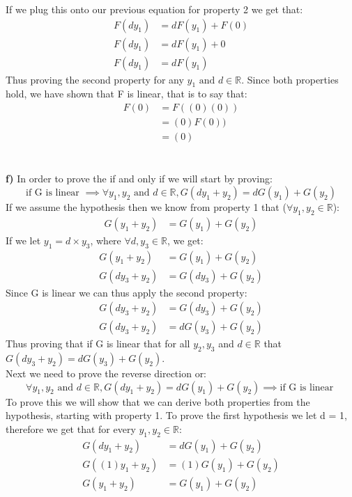 \documentclass[11pt]{article}
\begin{document}
If we plug this onto our previous equation for property 2 we get that:
\begin{align*}
F(dy_1) &= dF(y_1) + F(0)\\
F(dy_1) &= dF(y_1) + 0\\
F(dy_1) &= dF(y_1)
\end{align*}
Thus proving the second property for any $y_1 \text{ and } d \in \mathbb{R}$. Since both properties hold, we have shown that F is linear, that is to say that:
\begin{align*}
F(0) &= F((0)(0))\\
       &= (0)F(0))\\
       &= (0)
\end{align*}\\\\
\textbf{f)} In order to prove the if and only if we will start by proving:
\[ \text{if G is linear } \implies \forall y_1,y_2 \text{ and }d \in \mathbb{R}, G(dy_1 + y_2) = dG(y_1) + G(y_2) \]
If we assume the hypothesis then we know from property 1 that ($\forall y_1, y_2 \in \mathbb{R}$): 
\begin{align*}
G(y_1 + y_2) &= G(y_1) + G(y_2)
\end{align*}
If we let $y_1 = d \times y_3$, where $\forall d, y_3 \in \mathbb{R}$, we get:
\begin{align*}
G(y_1 + y_2) &= G(y_1) + G(y_2)\\
G(d y_3 + y_2) &= G(d y_3) + G(y_2)
\end{align*}
Since G is linear we can thus apply the second property: 
\begin{align*}
G(d y_3 + y_2) &= G(d y_3) + G(y_2)\\
G(d y_3 + y_2) &= dG(y_3) + G(y_2)
\end{align*}
Thus proving that if G is linear that for all $y_2,y_3$ and $d \in \mathbb{R}$ that $G(d y_3 + y_2) = dG(y_3) + G(y_2)$. \\
Next we need to prove the reverse direction or:
\[  \forall y_1,y_2 \text{ and }d \in \mathbb{R}, G(dy_1 + y_2) = dG(y_1) + G(y_2) \implies \text{if G is linear } \]
To prove this we will show that we can derive both properties from the hypothesis, starting with property 1. To prove the first hypothesis we let d = 1, therefore we get that for every $y_1, y_2 \in \mathbb{R}$:
\begin{align*}
G(dy_1 + y_2) &= dG(y_1) + G(y_2)\\
G((1)y_1 + y_2) &= (1)G(y_1) + G(y_2)\\
G(y_1 + y_2) &= G(y_1) + G(y_2)
\end{align*}
\end{document}
